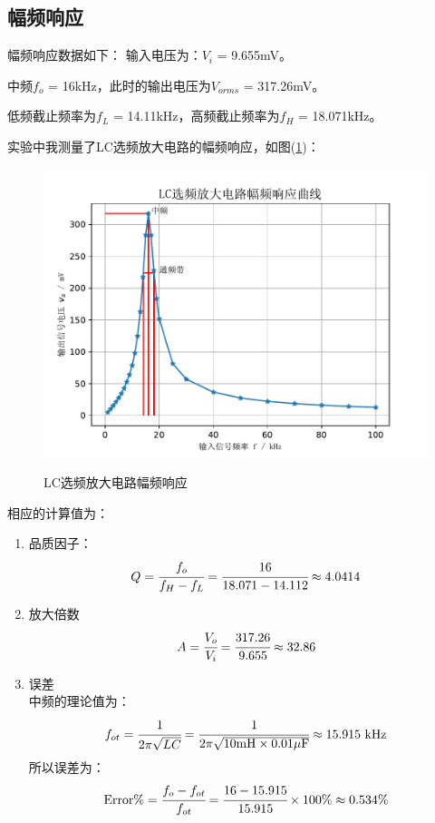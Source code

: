 \documentclass[a4paper]{article}
\begin{document}
\subsection{幅频响应}
幅频响应数据如下：
输入电压为：$V_i$ = 9.655mV。

中频$f_o$ = 16kHz，此时的输出电压为$V_{orms}$ = 317.26mV。

低频截止频率为$f_L$ = 14.11kHz，高频截止频率为$f_H$ = 18.071kHz。

实验中我测量了LC选频放大电路的幅频响应，如图(\ref{AFCfig})：
\begin{figure}[!h]
\centering
\includegraphics[width=12cm]{fig/AFC.pdf}\\
\caption{LC选频放大电路幅频响应}\label{AFCfig}
\end{figure}

相应的计算值为：
\begin{enumerate}
\item 品质因子：\\
\begin{equation}
Q = \cfrac{f_o}{f_H - f_L} = \cfrac{16}{18.071 - 14.112} \approx 4.0414\label{Q}
\end{equation}
\item 放大倍数\\
\begin{equation}
A = \cfrac{V_o}{V_i} = \cfrac{317.26}{9.655} \approx 32.86\label{A_V}
\end{equation}
\item 误差\\
中频的理论值为：
\begin{equation}
f_{ot} = \cfrac{1}{2\pi\sqrt{LC}} = \cfrac{1}{2\pi\sqrt{10\text{mH}\times 0.01\mu \text{F}}} \approx 15.915\text{ kHz}\label{fo_theory}
\end{equation}
所以误差为：
\begin{equation}
\text{Error\%} = \cfrac{f_o - f_{ot}}{f_{ot}} = \cfrac{16-15.915}{15.915}\times 100\% \approx 0.534\%\label{Error}
\end{equation}
\end{enumerate}
\end{document}
